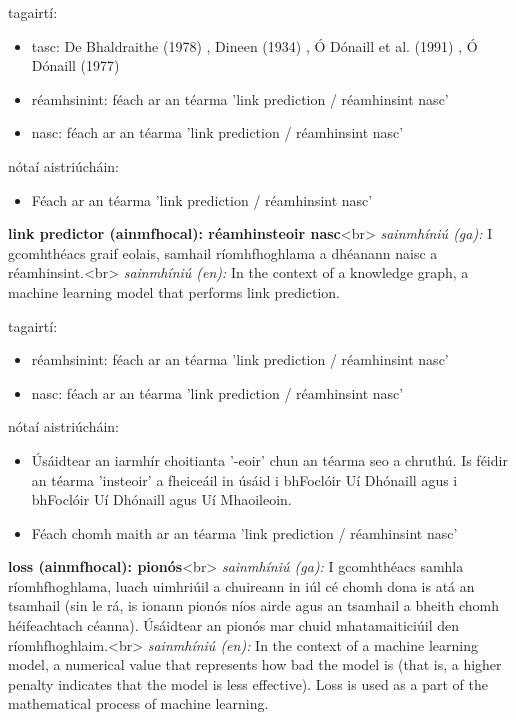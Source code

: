 \documentclass{article}
\begin{document}
tagairtí:
\begin{itemize}
	\item tasc: De Bhaldraithe (1978) \cite{de-bhaldraithe}, Dineen (1934) \cite{dineen}, Ó Dónaill et al. (1991) \cite{focloir-beag}, Ó Dónaill (1977) \cite{odonaill}
	\item réamhsinint: féach ar an téarma 'link prediction / réamhinsint nasc'
	\item nasc: féach ar an téarma 'link prediction / réamhinsint nasc'
\end{itemize}

nótaí aistriúcháin:
\begin{itemize}
	\item Féach ar an téarma 'link prediction / réamhinsint nasc'
\end{itemize}


\textbf{link predictor (ainmfhocal): réamhinsteoir nasc}<br>
\textit{sainmhíniú (ga):} I gcomhthéacs graif eolais, samhail ríomhfhoghlama a dhéanann naisc a réamhinsint.<br>
\textit{sainmhíniú (en):} In the context of a knowledge graph, a machine learning model that performs link prediction.

tagairtí:
\begin{itemize}
	\item réamhsinint: féach ar an téarma 'link prediction / réamhinsint nasc'
	\item nasc: féach ar an téarma 'link prediction / réamhinsint nasc'
\end{itemize}

nótaí aistriúcháin:
\begin{itemize}
	\item Úsáidtear an iarmhír choitianta '-eoir' chun an téarma seo a chruthú. Is féidir an téarma 'insteoir' a fheiceáil in úsáid i bhFoclóir Uí Dhónaill agus i bhFoclóir Uí Dhónaill agus Uí Mhaoileoin.
	\item Féach chomh maith ar an téarma 'link prediction / réamhinsint nasc'
\end{itemize}


\textbf{loss (ainmfhocal): pionós}<br>
\textit{sainmhíniú (ga):} I gcomhthéacs samhla ríomhfhoghlama, luach uimhriúil a chuireann in iúl cé chomh dona is atá an tsamhail (sin le rá, is ionann pionós níos airde agus an tsamhail a bheith chomh héifeachtach céanna). Úsáidtear an pionós mar chuid mhatamaiticiúil den ríomhfhoghlaim.<br>
\textit{sainmhíniú (en):} In the context of a machine learning model, a numerical value that represents how bad the model is (that is, a higher penalty indicates that the model is less effective). Loss is used as a part of the mathematical process of machine learning.
\end{document}
